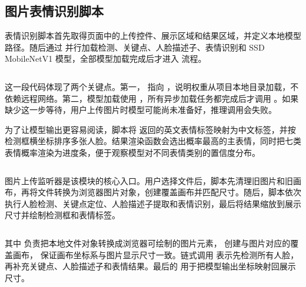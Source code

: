 \inputminted[firstline=21,lastline=22,firstnumber=21]{html}{code/face-recognition/webcam_face_tracking.html}

\inputminted[firstline=101,lastline=115,firstnumber=101]{html}{code/face-recognition/webcam_face_tracking.html}

\subsection*{图片表情识别脚本}

表情识别脚本首先取得页面中的上传控件、展示区域和结果区域，并定义本地模型路径。随后通过  并行加载检测、关键点、人脸描述子、表情识别和 SSD MobileNetV1 模型，全部模型加载完成后才进入  流程。

\inputminted[firstline=1,lastline=23,firstnumber=1]{javascript}{code/face-recognition/dist/expression_script.js}

这一段代码体现了两个关键点。第一， 指向 ，说明权重从项目本地目录加载，不依赖远程网络。第二，模型加载使用 ，所有异步加载任务都完成后才调用 。如果缺少这一步等待，用户上传图片时模型可能尚未准备好，推理调用会失败。

为了让模型输出更容易阅读，脚本将  返回的英文表情标签映射为中文标签，并按检测框横坐标排序多张人脸。结果渲染函数会选出概率最高的主表情，同时把七类表情概率渲染为进度条，便于观察模型对不同表情类别的置信度分布。

\inputminted[firstline=38,lastline=100,firstnumber=38]{javascript}{code/face-recognition/dist/expression_script.js}

图片上传监听器是该模块的核心入口。用户选择文件后，脚本先清理旧图片和旧画布，再将文件转换为浏览器图片对象，创建覆盖画布并匹配尺寸。随后，脚本依次执行人脸检测、关键点定位、人脸描述子提取和表情识别，最后将结果缩放到展示尺寸并绘制检测框和表情标签。

\inputminted[firstline=102,lastline=146,firstnumber=102]{javascript}{code/face-recognition/dist/expression_script.js}

其中  负责把本地文件对象转换成浏览器可绘制的图片元素， 创建与图片对应的覆盖画布， 保证画布坐标系与图片显示尺寸一致。链式调用  表示先检测所有人脸，再补充关键点、人脸描述子和表情结果。最后的  用于把模型输出坐标映射回展示尺寸。

